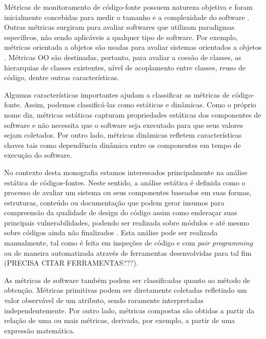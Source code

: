 %

Métricas de monitoramento de código-fonte possuem natureza objetiva e foram inicialmente concebidas para medir o tamanho e a complexidade do software \cite{henry1984kafura}\cite{troy1981zweben}\cite{yau1985zweben}. Outras métricas surgiram para avaliar softwares que utilizam paradigmas específicos, não sendo aplicáveis a qualquer tipo de software. Por exemplo, métricas orientada a objetos são usadas para avaliar sistemas orientados a objetos \cite{systa2000}. Métricas OO são destinadas, portanto, para avaliar a coesão de classes, as hierarquias de classes existentes, nível de acoplamento entre classes, reuso de código, dentre outras características.

%

Algumas características importantes ajudam a classificar as métricas de código-fonte. Assim, podemos classificá-las como estáticas e dinâmicas. Como o próprio nome diz, métricas estáticas capturam propriedades estáticas dos componentes de software e não necessita que o software seja executado para que seus valores sejam coletados. Por outro lado, métricas dinâmicas refletem características chaves tais como dependência dinâmica entre os componentes em tempo de execução do software.

%

No contexto desta monografia estamos interessados principalmente na análise estática de códigos-fontes. Neste sentido, a análise estática é definida como o processo de avaliar um sistema ou seus componentes baseados em suas formas, estruturas, conteúdo ou documentação que podem gerar insumos para compreensão da qualidade de design do código assim como enderaçar suas principais vulnerabilidades, podendo ser realizada sobre módulos e até mesmo sobre códigos ainda não finalizados \cite{black2009}. Esta análise pode ser realizada manualmente, tal como é feita em inspeções de código e com \emph{pair programming} ou de maneira automatizada através de ferramentas desenvolvidas para tal fim (PRECISA CITAR FERRAMENTAS???). 

%

As métricas de software também podem ser classificadas quanto ao método de obtenção. Métricas primitivas podem ser diretamente coletadas refletindo um valor observável de um atributo, sendo raramente interpretadas independentemente. Por outro lado, métricas compostas são obtidas a partir da relação de uma ou mais métricas, derivada, por exemplo, a partir de uma expressão matemática.

%

